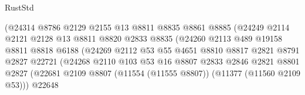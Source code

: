 \begin{lexlean}{RustStd}
\begin{coremodule}
                                    (@24314
                                      @8786
                                      @2129
                                      @2155
                                      @13
                                      @8811
                                      @8835
                                      @8861
                                      @8885
                                      (@24249
                                        @2114
                                        @2121
                                        @2128
                                        @13
                                        @8811
                                        @8820
                                        @2833
                                        @8835
                                        (@24260
                                          @2113
                                          @489
                                          @19158
                                          @8811
                                          @8818
                                          @6188
                                          (@24269
                                            @2112
                                            @53
                                            @55
                                            @4651
                                            @8810
                                            @8817
                                            @2821
                                            @8791
                                            @2827
                                            @22721
                                            (@24268
                                              @2110
                                              @103
                                              @53
                                              @16
                                              @8807
                                              @2833
                                              @2846
                                              @2821
                                              @8801
                                              @2827
                                              (@22681
                                                @2109
                                                @8807
                                                (@11554 (@11555 @8807))
                                                (@11377 (@11560 @2109 @53)))
                                              @22648

\end{coremodule}
\end{lexlean}
